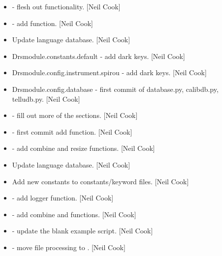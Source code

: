 \documentclass[a4paper,10pt,english]{report}
\begin{document}
\begin{itemize}
\item {} 
 - flesh out functionality. {[}Neil Cook{]}

\item {} 
 - add  function.
{[}Neil Cook{]}

\item {} 
Update language database. {[}Neil Cook{]}

\item {} 
Drsmodule.constants.default - add dark keys. {[}Neil Cook{]}

\item {} 
Drsmodule.config.instrument.spirou - add dark keys. {[}Neil Cook{]}

\item {} 
Drsmodule.config.database - first commit of database.py, calibdb.py,
telludb.py. {[}Neil Cook{]}

\item {} 
 - fill out more of the sections. {[}Neil Cook{]}

\item {} 
 - first commit add  function. {[}Neil Cook{]}

\item {} 
 - add combine and resize functions. {[}Neil Cook{]}

\item {} 
Update language database. {[}Neil Cook{]}

\item {} 
Add new constants to constants/keyword files. {[}Neil Cook{]}

\item {} 
 - add  logger function. {[}Neil Cook{]}

\item {} 
 - add combine and  functions. {[}Neil Cook{]}

\item {} 
 - update the blank example script. {[}Neil Cook{]}

\item {} 
 - move file processing to
. {[}Neil Cook{]}


\end{itemize}
\end{document}
